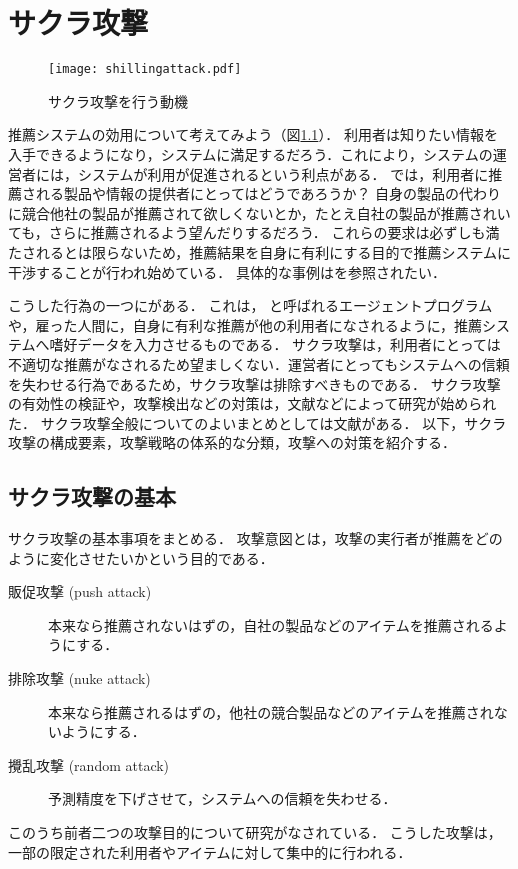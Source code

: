 \chapter{サクラ攻撃}
\label{sec:shilling}

\begin{figure}
\centering
\texttt{[image: shillingattack.pdf]}
\caption{サクラ攻撃を行う動機}
\label{fig:shilling-motivation}
\end{figure}

推薦システムの効用について考えてみよう（図\ref{fig:shilling-motivation}）．
利用者は知りたい情報を入手できるようになり，システムに満足するだろう．これにより，システムの運営者には，システムが利用が促進されるという利点がある．
では，利用者に推薦される製品や情報の提供者にとってはどうであろうか？
自身の製品の代わりに競合他社の製品が推薦されて欲しくないとか，たとえ自社の製品が推薦されいても，さらに推薦されるよう望んだりするだろう．
これらの要求は必ずしも満たされるとは限らないため，推薦結果を自身に有利にする目的で推薦システムに干渉することが行われ始めている．
具体的な事例は\cite{www:04:01}を参照されたい．

こうした行為の一つにがある．
これは， と呼ばれるエージェントプログラムや，雇った人間に，自身に有利な推薦が他の利用者になされるように，推薦システムへ嗜好データを入力させるものである．
サクラ攻撃は，利用者にとっては不適切な推薦がなされるため望ましくない．運営者にとってもシステムへの信頼を失わせる行為であるため，サクラ攻撃は排除すべきものである．
サクラ攻撃の有効性の検証や，攻撃検出などの対策は，文献\cite{jacm:04:02,www:04:01}などによって研究が始められた．
サクラ攻撃全般についてのよいまとめとしては文献\cite{ieeem:07:07}がある．
以下，サクラ攻撃の構成要素，攻撃戦略の体系的な分類，攻撃への対策を紹介する．

\section{サクラ攻撃の基本}
\label{sec:shilling:basics}

サクラ攻撃の基本事項をまとめる．
攻撃意図とは，攻撃の実行者が推薦をどのように変化させたいかという目的である．
\begin{description}
 \item[販促攻撃 (push attack)] 本来なら推薦されないはずの，自社の製品などのアイテムを推薦されるようにする．
 \item[排除攻撃 (nuke attack)] 本来なら推薦されるはずの，他社の競合製品などのアイテムを推薦されないようにする．
 \item[攪乱攻撃 (random attack)] 予測精度を下げさせて，システムへの信頼を失わせる．
\end{description}
このうち前者二つの攻撃目的について研究がなされている．
こうした攻撃は，一部の限定された利用者やアイテムに対して集中的に行われる．

